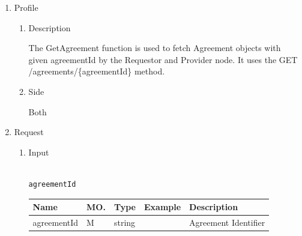 \newpage


\begin{enumerate}

\item Profile

\begin{enumerate}

\item Description

The GetAgreement function is used to fetch Agreement objects with given agreementId by the Requestor and Provider node. 
It uses the GET /agreements/\{agreementId\} method.

\item Side

Both

\end{enumerate}

\item Request

\begin{enumerate}

\item Input

\begin{tcolorbox}[boxrule=0pt, frame empty]
\begin{verbatim}

agreementId

\end{verbatim}
\end{tcolorbox}


\begin{table}[H]
\footnotesize

\begin{center}
\begin{tabular}{|p{3cm}|l|p{3cm}|p{3cm}|p{4cm}|} 
\hline
\rowcolor{lightgray}	Name	& MO.	& Type	& Example & 	Description \\
\hline

agreementId	& M & 	string				&			& Agreement Identifier \\
\hline

\end{tabular}
\end{center}


\end{table}
\end{enumerate}
\end{enumerate}
